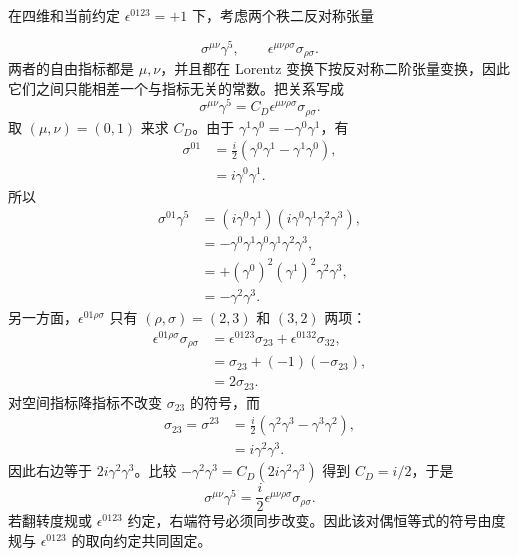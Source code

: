 \begin{derivation}
在四维和当前约定 $\epsilon^{0123}=+1$ 下，考虑两个秩二反对称张量

\begin{equation*}
\sigma^{\mu\nu}\gamma^5,
\qquad
\epsilon^{\mu\nu\rho\sigma}\sigma_{\rho\sigma}.
\end{equation*}
两者的自由指标都是 $\mu,\nu$，并且都在 Lorentz 变换下按反对称二阶张量变换，因此它们之间只能相差一个与指标无关的常数。把关系写成
\begin{equation*}
\sigma^{\mu\nu}\gamma^5
=C_D\epsilon^{\mu\nu\rho\sigma}\sigma_{\rho\sigma}.
\end{equation*}
取 $(\mu,\nu)=(0,1)$ 来求 $C_D$。由于
$\gamma^1\gamma^0=-\gamma^0\gamma^1$，有
\begin{align*}
\sigma^{01}
&=\frac{i}{2}(\gamma^0\gamma^1-\gamma^1\gamma^0),\\
&=i\gamma^0\gamma^1.
\end{align*}
所以
\begin{align*}
\sigma^{01}\gamma^5
&=(i\gamma^0\gamma^1)
(i\gamma^0\gamma^1\gamma^2\gamma^3),\\
&=-\gamma^0\gamma^1\gamma^0\gamma^1\gamma^2\gamma^3,\\
&=+(\gamma^0)^2(\gamma^1)^2\gamma^2\gamma^3,\\
&=-\gamma^2\gamma^3.
\end{align*}
另一方面，$\epsilon^{01\rho\sigma}$ 只有 $(\rho,\sigma)=(2,3)$ 和 $(3,2)$ 两项：
\begin{align*}
\epsilon^{01\rho\sigma}\sigma_{\rho\sigma}
&=\epsilon^{0123}\sigma_{23}+\epsilon^{0132}\sigma_{32},\\
&=\sigma_{23}+(-1)(-\sigma_{23}),\\
&=2\sigma_{23}.
\end{align*}
对空间指标降指标不改变 $\sigma_{23}$ 的符号，而
\begin{align*}
\sigma_{23}=\sigma^{23}
&=\frac{i}{2}(\gamma^2\gamma^3-\gamma^3\gamma^2),\\
&=i\gamma^2\gamma^3.
\end{align*}
因此右边等于 $2i\gamma^2\gamma^3$。比较
$-\gamma^2\gamma^3=C_D(2i\gamma^2\gamma^3)$ 得到
$C_D=i/2$，于是
\begin{equation*}
{
\sigma^{\mu\nu}\gamma^5
=\frac{i}{2}\epsilon^{\mu\nu\rho\sigma}\sigma_{\rho\sigma}.}
\end{equation*}
若翻转度规或 $\epsilon^{0123}$ 约定，右端符号必须同步改变。因此该对偶恒等式的符号由度规与 $\epsilon^{0123}$ 的取向约定共同固定。
\end{derivation}
